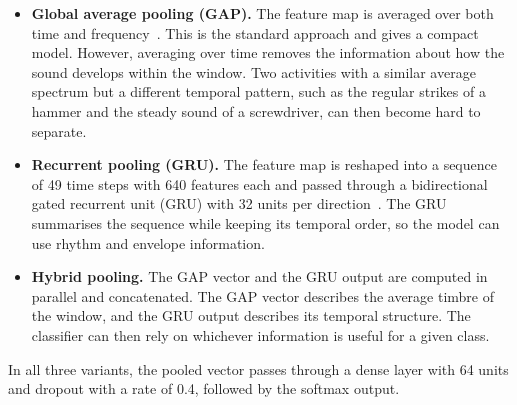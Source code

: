 \begin{itemize}
  \item \textbf{Global average pooling (GAP).} The feature map is averaged over
  both time and frequency~\cite{lin2014network}. This is the standard approach and gives a compact model. However,
  averaging over time removes the information about how the sound develops within
  the window. Two activities with a similar average spectrum but a different
  temporal pattern, such as the regular strikes of a hammer and the steady sound
  of a screwdriver, can then become hard to separate.
  \item \textbf{Recurrent pooling (GRU).} The feature map is reshaped into a
  sequence of 49 time steps with 640 features each and passed through a
  bidirectional gated recurrent unit (GRU) with 32 units per direction~\cite{cho2014learning}. The GRU summarises the sequence while keeping its
  temporal order, so the model can use rhythm and envelope information.
  \item \textbf{Hybrid pooling.} The GAP vector and the GRU output are computed in
  parallel and concatenated. The GAP vector describes the average timbre of the
  window, and the GRU output describes its temporal structure. The classifier can
  then rely on whichever information is useful for a given class.
\end{itemize}

In all three variants, the pooled vector passes through a dense layer with 64
units and dropout with a rate of 0.4, followed by the softmax output.

